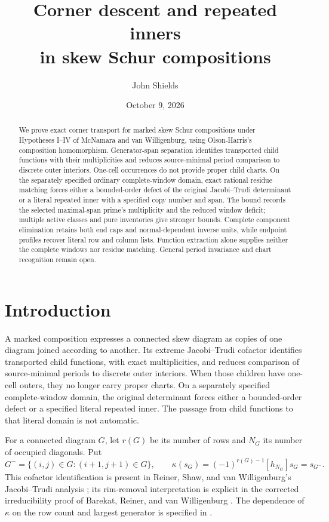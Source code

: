\documentclass[11pt,a4paper]{amsart}
\title[Corner descent and repeated inners in skew Schur compositions]{Corner descent and repeated inners\\in skew Schur compositions}
\author{John Shields}
\date{October 9, 2026}
\numberwithin{equation}{section}
\theoremstyle{plain}
\theoremstyle{definition}
\begin{document}
\begin{abstract}
We prove exact corner transport for marked skew Schur compositions under Hypotheses I--IV of McNamara and van Willigenburg, using Olson-Harris's composition homomorphism.  Generator-span separation identifies transported child functions with their multiplicities and reduces source-minimal period comparison to discrete outer interiors.  One-cell occurrences do not provide proper child charts.  On the separately specified ordinary complete-window domain, exact rational residue matching forces either a bounded-order defect of the original Jacobi--Trudi determinant or a literal repeated inner with a specified copy number and span.  The bound records the selected maximal-span prime's multiplicity and the reduced window deficit; multiple active classes and pure inventories give stronger bounds.  Complete component elimination retains both end caps and normal-dependent inverse units, while endpoint profiles recover literal row and column lists.  Function extraction alone supplies neither the complete windows nor residue matching.  General period invariance and chart recognition remain open.
\end{abstract}
\maketitle

\section{Introduction}\label{sec:introduction}

A marked composition expresses a connected skew diagram as copies of one diagram joined according to another.  Its extreme Jacobi--Trudi cofactor identifies transported child functions, with exact multiplicities, and reduces comparison of source-minimal periods to discrete outer interiors.  When those children have one-cell outers, they no longer carry proper charts.  On a separately specified complete-window domain, the original determinant forces either a bounded-order defect or a specified literal repeated inner.  The passage from child functions to that literal domain is not automatic.

For a connected diagram \(G\), let \(r(G)\) be its number of rows and \(N_G\) its number of occupied diagonals.  Put
\begin{equation}\label{eq:corner-intro}
 G^- = \{(i,j)\in G:(i+1,j+1)\in G\},\qquad
 \kappa(s_G)=(-1)^{r(G)-1}[h_{N_G}]s_G=s_{G^-}.
\end{equation}
This cofactor identification is present in Reiner, Shaw, and van Willigenburg's Jacobi--Trudi analysis \cite[p.~132]{Reiner2007Coincidences}; its rim-removal interpretation is explicit in the corrected irreducibility proof of Barekat, Reiner, and van Willigenburg \cite[p.~1656]{Barekat2009CoincidencesCorrigendum}.  The dependence of \(\kappa\) on the row count and largest generator is specified in .
\end{document}
